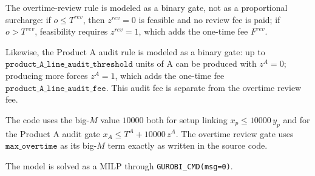 The overtime-review rule is modeled as a binary gate, not as a proportional surcharge: if \(o \le T^{rev}\), then \(z^{rev}=0\) is feasible and no review fee is paid; if \(o>T^{rev}\), feasibility requires \(z^{rev}=1\), which adds the one-time fee \(F^{rev}\).

Likewise, the Product A audit rule is modeled as a binary gate: up to \(\texttt{product\_A\_line\_audit\_threshold}\) units of A can be produced with \(z^{A}=0\); producing more forces \(z^{A}=1\), which adds the one-time fee \(\texttt{product\_A\_line\_audit\_fee}\). This audit fee is separate from the overtime review fee.

The code uses the big-\(M\) value \(10000\) both for setup linking \(x_p \le 10000\,y_p\) and for the Product A audit gate \(x_A \le T^A + 10000\,z^A\). The overtime review gate uses \(\texttt{max\_overtime}\) as its big-\(M\) term exactly as written in the source code.

The model is solved as a MILP through \texttt{GUROBI\_CMD(msg=0)}.
